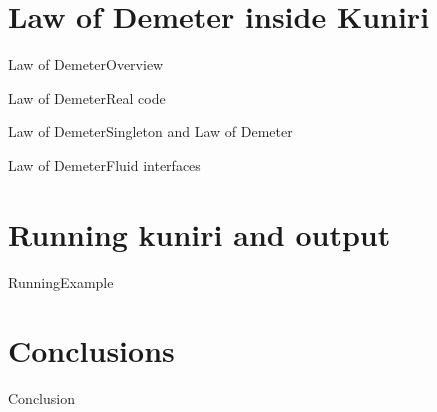 \documentclass[10pt]{beamer}
\begin{document}
\section{Law of Demeter inside Kuniri}
\begin{frame}{Law of Demeter}{Overview}
\end{frame}

\begin{frame}{Law of Demeter}{Real code}
\end{frame}

\begin{frame}{Law of Demeter}{Singleton and Law of Demeter}
\end{frame}

\begin{frame}{Law of Demeter}{Fluid interfaces}
\end{frame}

\section{Running kuniri and output}
\begin{frame}{Running}{Example}
\end{frame}

\section{Conclusions}
\begin{frame}{Conclusion}{}
\end{frame}

{\1
\begin{frame}
\end{frame}}
\end{document}
